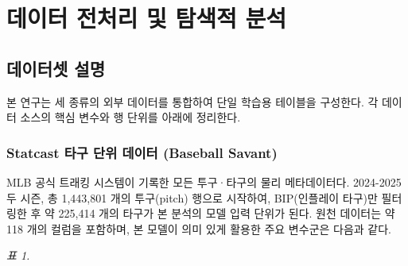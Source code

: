 \documentclass[
  11.5pt,
]{article}
\begin{document}
\section{데이터 전처리 및 탐색적
분석}\label{uxb370uxc774uxd130-uxc804uxcc98uxb9ac-uxbc0f-uxd0d0uxc0c9uxc801-uxbd84uxc11d}

\subsection{데이터셋 설명}\label{uxb370uxc774uxd130uxc14b-uxc124uxba85}

본 연구는 세 종류의 외부 데이터를 통합하여 단일 학습용 테이블을
구성한다. 각 데이터 소스의 핵심 변수와 행 단위를 아래에 정리한다.

\subsubsection{Statcast 타구 단위 데이터 (Baseball
Savant)}\label{statcast-uxd0c0uxad6c-uxb2e8uxc704-uxb370uxc774uxd130-baseball-savant}

MLB 공식 트래킹 시스템이 기록한 모든 투구·타구의 물리 메타데이터다.
2024-2025 두 시즌, 총 1,443,801 개의 투구(pitch) 행으로 시작하여,
BIP(인플레이 타구)만 필터링한 후 약 225,414 개의 타구가 본 분석의 모델
입력 단위가 된다. 원천 데이터는 약 118 개의 컬럼을 포함하며, 본 모델이
의미 있게 활용한 주요 변수군은 다음과 같다.

\emph{표 1.}
\end{document}

